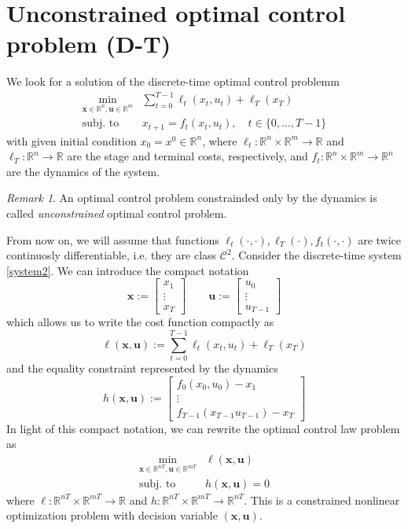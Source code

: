 \documentclass[openany]{book}
\newcommand{\R}{\mathbb{R}}               %
\theoremstyle{definition}
\theoremstyle{remark}
\newtheorem*{remark}{Remark}
\begin{document}
\section{Unconstrained optimal control problem (D-T)}
We look for a solution of the discrete-time optimal control problemm 
\begin{align*}
        \min_{\mathbf{x}\in\R^n,\mathbf{u}\in\R^m} & \displaystyle\sum_{t=0}^{T-1}\ell_t(x_t,u_t)+\ell_T(x_T)\\
        \text{subj. to } & x_{t+1} = f_t(x_t,u_t), \quad t\in\{0,\dots,T-1\} 
\end{align*}
with given initial condition $x_0 = x^0\in \R^n$, where $\ell_t:\R^n\times\R^m\to\R$ and $\ell_T:\R^n\to\R$ are the stage and terminal costs, respectively, and $f_t:\R^n\times\R^m\to\R^n$ are the dynamics of the system.
\begin{remark}
    An optimal control problem constrainded only by the dynamics is called \emph{unconstrained} optimal control problem.
\end{remark}

From now on, we will assume that functions $\ell_t(\cdot,\cdot),\ell_T(\cdot),f_t(\cdot,\cdot)$ are twice continuosly differentiable, i.e. they are class $\mathcal{C}^2$.
Consider the discrete-time system \eqref{system2}. We can introduce the compact notation 
\[
    \mathbf{x} := \begin{bmatrix}
        x_1 \\ \vdots \\ x_T
    \end{bmatrix} \qquad \mathbf{u} := \begin{bmatrix}
        u_0 \\ \vdots \\ u_{T-1}
    \end{bmatrix}
\]
which allows us to write the cost function compactly as 
\[
    \ell({\mathbf{x},\mathbf{u}}) := \sum_{t=0}^{T-1}\ell_t(x_t,u_t)+\ell_T(x_T)
\]
and the equality constraint represented by the dynamics 
\[
    h(\mathbf{x},\mathbf{u}) := \begin{bmatrix}
        f_0(x_0,u_0)-x_1 \\ \vdots \\ f_{T-1}(x_{T-1}u_{T-1})-x_T
    \end{bmatrix}
\]
In light of this compact notation, we can rewrite the optimal control law problem as 
\begin{align*}
    \min_{\mathbf{x}\in\R^{nT},\mathbf{u}\in\R^{mT}} &\ell(\mathbf{x},\mathbf{u})\\
    \text{subj. to } & h(\mathbf{x},\mathbf{u})=0
\end{align*}
where $\ell:\R^{nT}\times\R^{mT}\to\R$ and $h:\R^{nT}\times\R^{mT}\to\R^{nT}$. This is a constrained nonlinear optimization problem with decision variable $(\mathbf{x},\mathbf{u})$.
\end{document}
